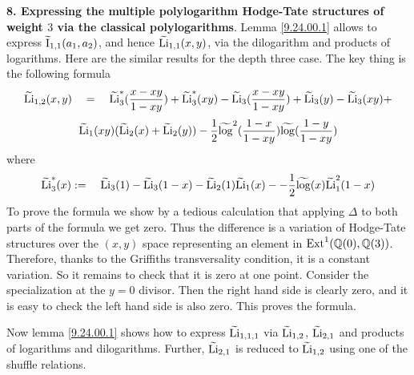 \documentclass[10pt]{article}
\begin{document}
{\bf 8. Expressing the multiple polylogarithm Hodge-Tate structures  of weight
  $3$ via the  classical polylogarithms}. Lemma \ref{9.24.00.1} allows to express 
$\widetilde {\rm I}_{1,1}(a_1, a_2)$, and hence $\widetilde {\rm Li}_{1,1}(x,y)$,  
via the dilogarithm and products of logarithms. 
Here are the similar results for the depth three case. 
The key thing is 
the following formula
$$
\widetilde {\rm Li}_{1,2}(x,y) \quad =\quad  \widetilde {\rm Li}_3^*(\frac{x-xy}{1-xy}) + \widetilde {\rm Li}_3^*(xy) -  \widetilde {\rm Li}_3(\frac{x-xy}{1-xy}) +\widetilde {\rm Li}_3(y) -
\widetilde {\rm Li}_3(xy) +
$$
$$
  \widetilde {\rm Li}_1(xy)(\widetilde {\rm Li}_2(x) 
+ \widetilde {\rm Li}_2(y)) - \frac{1}{2}\widetilde\log^2(\frac{1-x}{1-xy}) \widetilde\log(\frac{1-y}{1-xy})
$$
where
$$
\widetilde {\rm Li}_3^*(x) := \quad \widetilde {\rm Li}_3(1) - \widetilde {\rm Li}_3(1-x)  -
\widetilde {\rm Li}_2(1)\widetilde {\rm Li}_1(x) - - \frac{1}{2}\widetilde \log(x) \widetilde {\rm Li}_1^2(1-x)
$$ 
To prove the formula we show by  a tedious calculation  
 that applying $\Delta$ to both parts of the formula we get zero. 
Thus the difference is a variation of Hodge-Tate structures over the $(x,y)$ space 
representing an element in ${\rm Ext}^1({\mathbb Q}(0), {\mathbb Q}(3))$. 
Therefore, thanks to the Griffiths transversality condition, it  is a constant variation. 
So it remains to check that it is zero at one point. 
Consider the specialization at the $y=0$ divisor. Then the right hand side is clearly zero, 
and it is easy to check the left hand side is also zero. This proves the formula. 
  
Now lemma \ref{9.24.00.1} shows how to express $\widetilde {\rm Li}_{1,1,1}$ via 
$\widetilde {\rm Li}_{1,2}$, $\widetilde {\rm Li}_{2,1}$ and products of logarithms 
and dilogarithms. Further, $\widetilde {\rm Li}_{2,1}$ is reduced to 
$\widetilde {\rm Li}_{1,2}$ using one of the shuffle relations. 
\end{document}
